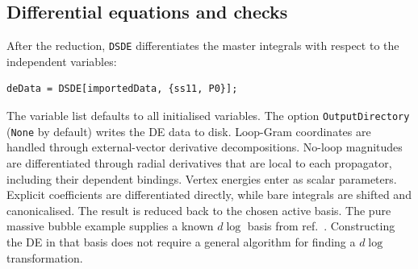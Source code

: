 \documentclass[11pt,a4paper]{article}
\begin{document}
\subsection{Differential equations and checks}
\label{sec:de}

After the reduction, \texttt{DSDE} differentiates the master integrals with respect to the
independent variables:
\begin{verbatim}
deData = DSDE[importedData, {ss11, P0}];
\end{verbatim}
The variable list defaults to all initialised variables. The option
\texttt{OutputDirectory} (\texttt{None} by default) writes the DE data to disk.
Loop-Gram coordinates are handled through external-vector derivative
decompositions. No-loop magnitudes are differentiated through radial derivatives that are local to
each propagator, including
their dependent bindings. Vertex energies enter as scalar parameters. Explicit coefficients are
differentiated directly, while bare integrals are shifted and canonicalised. The result is reduced
back to the chosen active basis. The pure massive bubble example supplies a known $d\log$ basis
from ref.~\cite{Chen:2026dqp}. Constructing the DE in that basis does not require a general
algorithm for finding a $d\log$ transformation.
\end{document}
